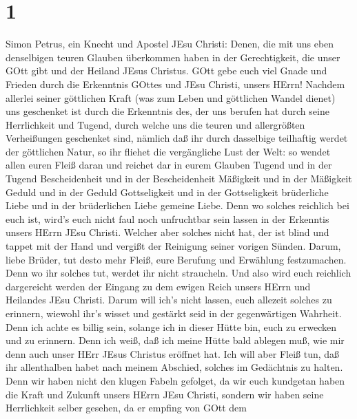 \hypertarget{section}{%
\section{1}\label{section}}

 Simon Petrus, ein Knecht und Apostel JEsu Christi: Denen,
die mit uns eben denselbigen teuren Glauben überkommen haben in der
Gerechtigkeit, die unser GOtt gibt und der Heiland JEsus Christus.
 GOtt gebe euch viel Gnade und Frieden durch die Erkenntnis
GOttes und JEsu Christi, unsers HErrn!  Nachdem allerlei
seiner göttlichen Kraft (was zum Leben und göttlichen Wandel dienet) uns
geschenket ist durch die Erkenntnis des, der uns berufen hat durch seine
Herrlichkeit und Tugend,  durch welche uns die teuren und
allergrößten Verheißungen geschenket sind, nämlich daß ihr durch
dasselbige teilhaftig werdet der göttlichen Natur, so ihr fliehet die
vergängliche Lust der Welt:  so wendet allen euren Fleiß
daran und reichet dar in eurem Glauben Tugend und in der Tugend
Bescheidenheit  und in der Bescheidenheit Mäßigkeit und in
der Mäßigkeit Geduld und in der Geduld Gottseligkeit  und in
der Gottseligkeit brüderliche Liebe und in der brüderlichen Liebe
gemeine Liebe.  Denn wo solches reichlich bei euch ist,
wird's euch nicht faul noch unfruchtbar sein lassen in der Erkenntis
unsers HErrn JEsu Christi.  Welcher aber solches nicht hat,
der ist blind und tappet mit der Hand und vergißt der Reinigung seiner
vorigen Sünden.  Darum, liebe Brüder, tut desto mehr Fleiß,
eure Berufung und Erwählung festzumachen. Denn wo ihr solches tut,
werdet ihr nicht straucheln.  Und also wird euch reichlich
dargereicht werden der Eingang zu dem ewigen Reich unsers HErrn und
Heilandes JEsu Christi.  Darum will ich's nicht lassen,
euch allezeit solches zu erinnern, wiewohl ihr's wisset und gestärkt
seid in der gegenwärtigen Wahrheit.  Denn ich achte es
billig sein, solange ich in dieser Hütte bin, euch zu erwecken und zu
erinnern.  Denn ich weiß, daß ich meine Hütte bald ablegen
muß, wie mir denn auch unser HErr JEsus Christus eröffnet hat.
 Ich will aber Fleiß tun, daß ihr allenthalben habet nach
meinem Abschied, solches im Gedächtnis zu halten.  Denn wir
haben nicht den klugen Fabeln gefolget, da wir euch kundgetan haben die
Kraft und Zukunft unsers HErrn JEsu Christi, sondern wir haben seine
Herrlichkeit selber gesehen,  da er empfing von GOtt dem
